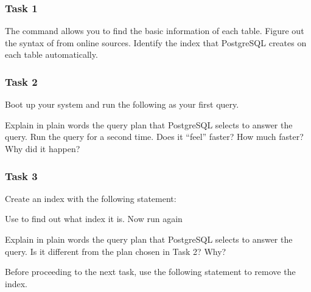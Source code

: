 \subsubsection{Task 1}

The  command allows you to find the basic information of each table. Figure out the syntax of  from online sources. Identify the index that PostgreSQL creates on each table automatically.

\subsubsection{Task 2}

Boot up your system and run the following as your first query.

\vgap

\noindent {}

\vgap

\noindent Explain in plain words the query plan that PostgreSQL selects to answer the query. Run the query for a second time. Does it ``feel'' faster? How much faster? Why did it happen?

\subsubsection{Task 3}

Create an index with the following statement:

\vgap

\noindent {}

\vgap

\noindent Use  to find out what index it is. Now run again

\vgap

\noindent {}

\vgap

\noindent Explain in plain words the query plan that PostgreSQL selects to answer the query. Is it different from the plan chosen in Task 2? Why?

\vgap

\noindent Before proceeding to the next task, use the following statement to remove the index.

\vgap

\noindent {}

